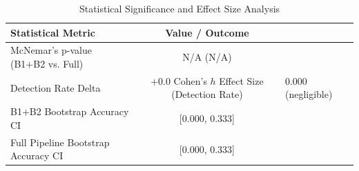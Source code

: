 \begin{table}[h]
\centering
\caption{Statistical Significance and Effect Size Analysis}
\label{tab:semantic_stats}
\begin{tabular}{lc}
\hline
\textbf{Statistical Metric} & \textbf{Value / Outcome} \\ \hline
McNemar's p-value (B1+B2 vs. Full) & N/A (N/A) \\
Detection Rate Delta & +0.0%
Cohen's $h$ Effect Size (Detection Rate) & 0.000 (negligible) \\
B1+B2 Bootstrap Accuracy CI & [0.000, 0.333] \\
Full Pipeline Bootstrap Accuracy CI & [0.000, 0.333] \\
\hline
\end{tabular}
\end{table}
